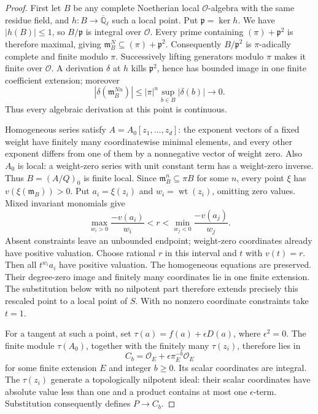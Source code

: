 \begin{proof}
First let \(B\) be any complete Noetherian local \(\mathcal O\)-algebra
with the same residue field, and \(h:B\to\overline{\mathbb Q}_\ell\)
such a local point. Put \(\mathfrak p=\ker h\). We have
\(|h(B)|\le1\), so \(B/\mathfrak p\) is integral over
\(\mathcal O\). Every prime containing \((\pi)+\mathfrak p^2\)
is therefore maximal, giving
\(\mathfrak m_B^N\subseteq(\pi)+\mathfrak p^2\).
Consequently \(B/\mathfrak p^2\) is \(\pi\)-adically complete
and finite modulo \(\pi\). Successively lifting generators modulo
\(\pi\) makes it finite over \(\mathcal O\). A derivation
\(\delta\) at \(h\) kills \(\mathfrak p^2\), hence has bounded
image in one finite coefficient extension; moreover
\[
 |\delta(\mathfrak m_B^{Nn})|
       \le |\pi|^n\sup_{b\in B}|\delta(b)|\longrightarrow0.
\]
Thus every algebraic derivation at this point is continuous.

Homogeneous series satisfy
\(A=A_0[z_1,\ldots,z_d]\): the exponent vectors of a fixed
weight have finitely many coordinatewise minimal elements, and every
other exponent differs from one of them by a nonnegative vector of
weight zero. Also \(A_0\) is local: a weight-zero series with unit
constant term has a weight-zero inverse. Thus \(B=(A/Q)_0\) is
finite local. Since \(\mathfrak m_B^n\subseteq\pi B\) for some
\(n\), every point \(\xi\) has \(v(\xi(\mathfrak m_B))>0\).
Put \(a_i=\xi(z_i)\) and \(w_i=\operatorname{wt}(z_i)\), omitting zero values. Mixed invariant
monomials give
\[
 \max_{w_i>0}\frac{-v(a_i)}{w_i}
 <r<\min_{w_j<0}\frac{-v(a_j)}{w_j}.
\]
Absent constraints leave an unbounded endpoint; weight-zero coordinates
already have positive valuation. Choose rational \(r\) in this
interval and \(t\) with \(v(t)=r\). Then all \(t^{w_i}a_i\)
have positive valuation. The homogeneous equations are preserved.
Their degree-zero image and finitely many coordinates lie in one finite
extension. The substitution below with no nilpotent part therefore
extends precisely this rescaled point to a local point of \(S\).
With no nonzero coordinate constraints take \(t=1\).

For a tangent at such a point, set
\(\tau(a)=f(a)+\epsilon D(a)\), where \(\epsilon^2=0\).
The finite module \(\tau(A_0)\), together with the
finitely many \(\tau(z_i)\), therefore lies in
\[
 C_b=\mathcal O_E+\epsilon\pi_E^{-b}\mathcal O_E
\]
for some finite extension \(E\) and integer \(b\ge0\).
Its scalar coordinates are integral. The \(\tau(z_i)\) generate
a topologically nilpotent ideal: their scalar coordinates have
absolute value less than one and a product contains at most one
\(\epsilon\)-term. Substitution consequently defines \(P\to C_b\).


\end{proof}
